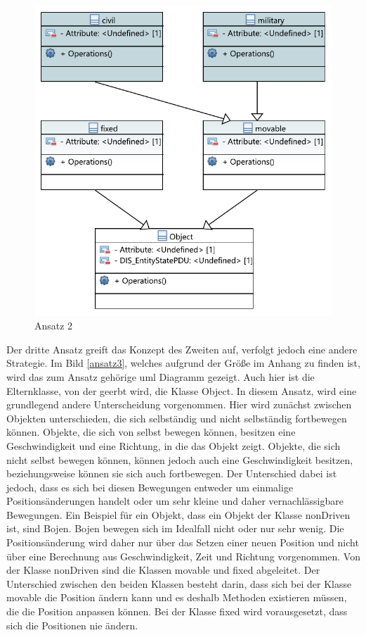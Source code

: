 \begin{figure}[H]
	\centering
	\includegraphics[scale=0.9]{bilder/pdfvorlagen/ansatz1}
	\caption[Ansatz 2]{Ansatz 2}
	\label{ansatz2}
\end{figure}
Der dritte Ansatz greift das Konzept des Zweiten auf, verfolgt jedoch eine andere Strategie. Im Bild \ref{ansatz3}, welches aufgrund der Größe im Anhang zu finden ist, wird das zum Ansatz gehörige \ac{uml} Diagramm gezeigt. Auch hier ist die Elternklasse, von der geerbt wird, die Klasse \glqq Object\grqq{}. In diesem Ansatz, wird eine grundlegend andere Unterscheidung vorgenommen. Hier wird zunächst zwischen Objekten unterschieden, die sich selbständig und nicht selbständig fortbewegen können. Objekte, die sich von selbst bewegen können,  besitzen eine Geschwindigkeit und eine Richtung, in die das Objekt zeigt. Objekte, die sich nicht selbst bewegen können, können jedoch auch eine Geschwindigkeit besitzen, beziehungsweise  können sie sich auch fortbewegen. Der Unterschied dabei ist jedoch, dass es sich bei diesen Bewegungen entweder um einmalige Positionsänderungen handelt oder um sehr kleine und daher vernachlässigbare Bewegungen. Ein Beispiel für ein Objekt, dass ein Objekt der Klasse \glqq nonDriven\grqq{} ist, sind Bojen. Bojen bewegen sich im Idealfall nicht oder nur sehr wenig. Die Positionsänderung wird daher nur über das Setzen einer neuen Position und nicht über eine Berechnung aus Geschwindigkeit, Zeit und Richtung vorgenommen. Von der Klasse  \glqq nonDriven\grqq{} sind die Klassen \glqq movable\grqq{} und   \glqq fixed\grqq{} abgeleitet. Der Unterschied zwischen den beiden Klassen besteht darin, dass sich bei der Klasse  \glqq movable\grqq{} die Position ändern kann und es deshalb Methoden existieren müssen, die die Position anpassen können. Bei der Klasse \glqq fixed\grqq{} wird vorausgesetzt, dass sich die Positionen nie ändern.\\
